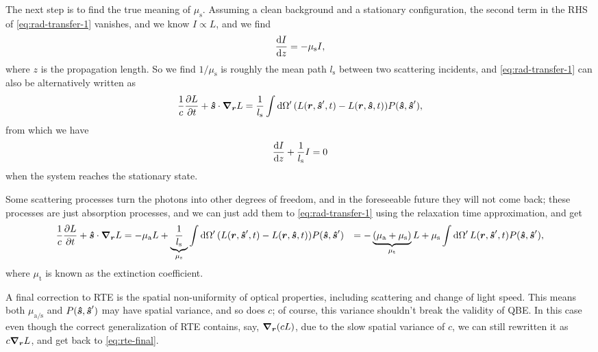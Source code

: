 \documentclass[hyperref, a4paper]{article}
\def\\{}%
\begin{document}
The next step is to find the true meaning of $\mu_{\text{s}}$. 
Assuming a clean background and a stationary configuration, 
the second term in the RHS of \eqref{eq:rad-transfer-1} vanishes, 
and we know $I \propto L$, 
and we find 
\[
    \dv{I}{z} = - \mu_{\text{s}} I, 
\]
where $z$ is the propagation length. 
So we find $1 / \mu_{\text{s}}$ is roughly 
the mean path $l_{\text{s}}$ between two scattering incidents, 
and \eqref{eq:rad-transfer-1} can also be alternatively written as 
\begin{equation}
    \frac{1}{c} \pdv{L}{t} + \vu*{s} \cdot \grad_{\vb*{r}} L = 
    \frac{1}{l_{\text{s}}} \int \dd{\Omega'} 
    (L(\vb*{r}, \vu*{s}', t) - L(\vb*{r}, \vu*{s}, t)) P(\vu*{s}, \vu*{s}'),
    \label{eq:rad-transfer-2}
\end{equation}
from which we have 
\begin{equation}
    \dv{I}{z} + \frac{1}{l_{\text{s}}} I = 0 
\end{equation}
when the system reaches the stationary state. 

Some scattering processes turn the photons into other degrees of freedom, 
and in the foreseeable future they will not come back; 
these processes are just absorption processes, 
and we can just add them to \eqref{eq:rad-transfer-1} 
using the relaxation time approximation, and get 
\begin{equation}
    \begin{aligned}
        \frac{1}{c} \pdv{L}{t} + \vu*{s} \cdot \grad_{\vb*{r}} L &= 
        - \mu_{\text{a}} L +
        \underbrace{\frac{1}{l_{\text{s}}}}_{\mu_{\text{s}}} \int \dd{\Omega'} 
        (L(\vb*{r}, \vu*{s}', t) - L(\vb*{r}, \vu*{s}, t)) P(\vu*{s}, \vu*{s}') \\
        &= - \underbrace{(\mu_{\text{a}} + \mu_{\text{s}})}_{\mu_{\text{t}}} L 
        + \mu_{\text{s}} \int \dd{\Omega'} 
        L(\vb*{r}, \vu*{s}', t) P(\vu*{s}, \vu*{s}') ,
    \end{aligned}
    \label{eq:rte-final}
\end{equation}
where $\mu_{\text{t}}$ is known as the extinction coefficient. 

A final correction to RTE is the spatial non-uniformity of optical properties, 
including scattering and change of light speed. 
This means both $\mu_{\text{a/s}}$ and $P(\vu*{s}, \vu*{s}')$ 
may have spatial variance, 
and so does $c$; 
of course, this variance shouldn't break the validity of QBE. 
In this case even though the correct generalization of RTE contains, say, 
$\grad_{\vb*{r}} (c L)$, 
due to the slow spatial variance of $c$, 
we can still rewritten it as $c \grad_{\vb*{r}} L$, 
and get back to \eqref{eq:rte-final}.
\end{document}
